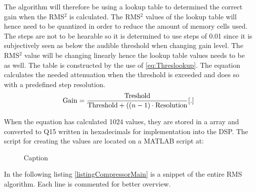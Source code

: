 The algorithm will therefore be using a lookup table to determined the correct gain when the RMS$^2$ is calculated. The RMS$^2$ values of the lookup table will hence need to be quantized in order to reduce the amount of memory cells used. The steps are not to be hearable so it is determined to use steps of 0.01 since it is subjectively seen as below the audible threshold when changing gain level. The RMS$^2$ value will be changing linearly hence the lookup table values needs to be as well. The table is constructed by the use of \autoref{eq:Threslookup}. The equation calculates the needed attenuation when the threshold is exceeded and does so with a predefined step resolution. 
\vspace{-2mm}
\begin{equation}\label{eq:Threslookup}
\text{Gain}=\frac{\text{Treshold}}{\text{Threshold}+((n-1) \cdot \text{Resolution}}\enhed{.}
\end{equation}
\begin{where}
\va{$Threshold$}{is 0.6 as calculated in \autoref{cha:CompressorDesign}{.}
\end{where}

\vspace{2mm}
When the equation has calculated 1024 values, they are stored in a array and converted to Q15 written in hexadecimals for implementation into the DSP.
The script for creating the values are located on a MATLAB script at: \\
 

\begin{figure}[H]
	\centering
	
	\caption{Caption }
	\label{fig:Driver10Test}
\end{figure}


In the following listing \ref{listingCompressorMain} is a snippet of the entire RMS algorithm. Each line is commented for better overview.

